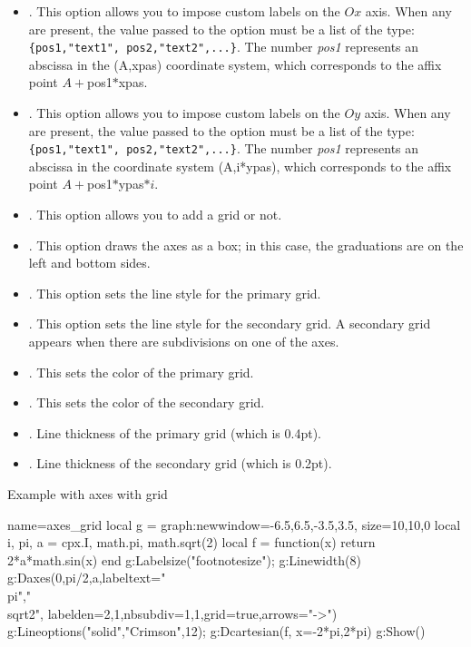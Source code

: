 \begin{itemize}
\begin{itemize}
    \item {}. This option allows you to impose custom labels on the $Ox$ axis. When any are present, the value passed to the option must be a list of the type: \verb|{pos1,"text1", pos2,"text2",...}|. The number \emph{pos1} represents an abscissa in the (A,xpas) coordinate system, which corresponds to the affix point $A+$pos1$*$xpas.
    \item {}. This option allows you to impose custom labels on the $Oy$ axis. When any are present, the value passed to the option must be a list of the type: \verb|{pos1,"text1", pos2,"text2",...}|. The number \emph{pos1} represents an abscissa in the coordinate system (A,i*ypas), which corresponds to the affix point $A+$pos1$*$ypas$*i$.
    \item {}. This option allows you to add a grid or not.
    \item {}. This option draws the axes as a box; in this case, the graduations are on the left and bottom sides.
    \item {}. This option sets the line style for the primary grid.
    \item {}. This option sets the line style for the secondary grid. A secondary grid appears when there are subdivisions on one of the axes.
    \item {}. This sets the color of the primary grid.     \item {}. This sets the color of the secondary grid.
    \item {}. Line thickness of the primary grid (which is 0.4pt).
    \item {}. Line thickness of the secondary grid (which is 0.2pt).
\end{itemize}
\end{itemize}


\begin{demo}{Example with axes with grid}
\begin{luadraw}{name=axes_grid}
local g = graph:new{window={-6.5,6.5,-3.5,3.5}, size={10,10,0}}
local i, pi, a = cpx.I, math.pi, math.sqrt(2)
local f = function(x) return 2*a*math.sin(x) end
g:Labelsize("footnotesize"); g:Linewidth(8)
g:Daxes({0,pi/2,a},{labeltext={"\\pi","\\sqrt{2}"}, labelden={2,1},nbsubdiv={1,1},grid=true,arrows="->"})
g:Lineoptions("solid","Crimson",12); g:Dcartesian(f, {x={-2*pi,2*pi}})
g:Show()
\end{luadraw}
\end{demo}

